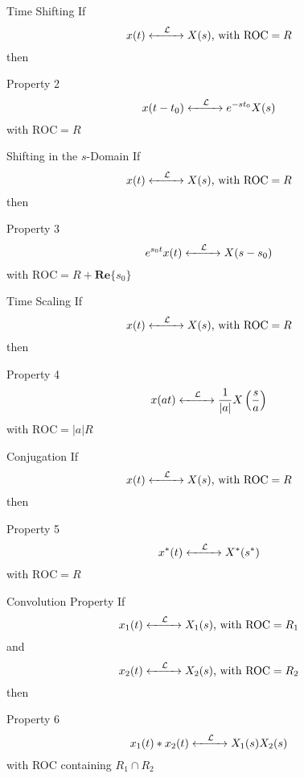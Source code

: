 \documentclass[aspectratio=169]{beamer}
\begin{document}
\begin{frame}{Time Shifting}
	If\\
	\[x(t) \xleftrightarrow[]{\quad\mathcal{L}\quad} X(s) \text{, with } \mathrm{ROC} =R\]
	then
	\begin{block}{Property 2}
		\[ x(t-t_0) \xleftrightarrow[]{\quad\mathcal{L}\quad} e^{-st_0}X(s) \]
		\centering
		 with $\mathrm{ROC} = R $
	\end{block}
\end{frame}

\begin{frame}{Shifting in the $ s $-Domain}
If\\
\[x(t) \xleftrightarrow[]{\quad\mathcal{L}\quad} X(s) \text{, with } \mathrm{ROC} =R\]
then
\begin{block}{Property 3}
	\[ e^{s_0t}x(t) \xleftrightarrow[]{\quad\mathcal{L}\quad} X(s-s_0) \]
	\centering
	with $\mathrm{ROC} = R + \mathbf{Re}\{s_0\} $
\end{block}
\end{frame}

\begin{frame}{Time Scaling}
If\\
\[x(t) \xleftrightarrow[]{\quad\mathcal{L}\quad} X(s) \text{, with } \mathrm{ROC} =R\]
then
\begin{block}{Property 4}
	\[ x(at) \xleftrightarrow[]{\quad\mathcal{L}\quad} \frac{1}{|a|}X\left(\frac{s}{a}\right) \]
	\centering
	with $\mathrm{ROC} = |a|R $
\end{block}
\end{frame}

\begin{frame}{Conjugation}
If\\
\[x(t) \xleftrightarrow[]{\quad\mathcal{L}\quad} X(s) \text{, with } \mathrm{ROC} =R\]
then
\begin{block}{Property 5}
	\[ x^*(t) \xleftrightarrow[]{\quad\mathcal{L}\quad} X^*(s^*) \]
	\centering
	with $\mathrm{ROC} = R $
\end{block}
\end{frame}

\begin{frame}{Convolution Property}
If\\
\[x_1(t) \xleftrightarrow[]{\quad\mathcal{L}\quad} X_1(s) \text{, with } \mathrm{ROC} =R_1\]
	and\\
\[ x_2(t) \xleftrightarrow[]{\quad\mathcal{L}\quad} X_2(s) \text{, with   } \mathrm{ROC} =R_2 \]
then
\begin{block}{Property 6}
	\[ x_1(t)*x_2(t) \xleftrightarrow[]{\quad\mathcal{L}\quad} X_1(s)X_2(s) \]
	\centering
	with ROC containing  $ R_1\cap R_2 $ 
\end{block}
\end{frame}
\end{document}
